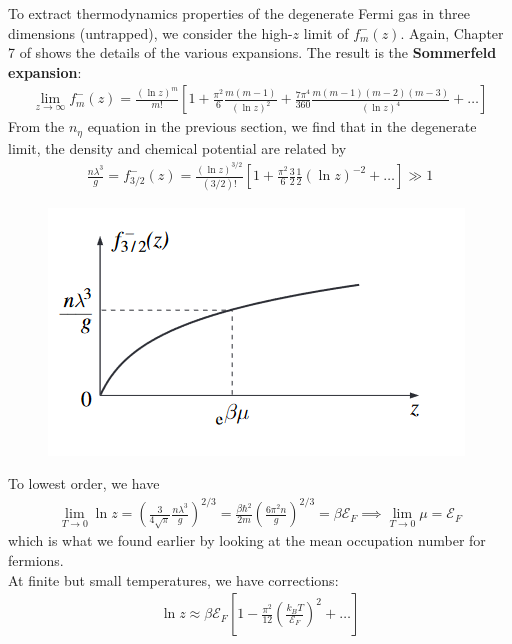\documentclass{book}
\theoremstyle{definition}
\newcommand{\be}{\beta}
\newcommand{\f}[2]{\frac{#1}{#2}}
\newcommand{\lp}{\left(}
\newcommand{\rp}{\right)}
\newcommand{\lb}{\left[}
\newcommand{\rb}{\right]}
\begin{document}
To extract thermodynamics properties of the degenerate Fermi gas in three dimensions (untrapped), we consider the high-$z$ limit of $f_m^-(z)$. Again, Chapter 7 of \cite{kardar2007statistical} shows the details of the various expansions. The result is the \textbf{Sommerfeld expansion}:
\begin{align*}
	\lim_{z\to \infty} f_m^-(z) = \f{(\ln z)^m}{m!} \lb 1 + \f{\pi^2}{6}  \f{m(m-1)}{(\ln z)^2} + \f{7\pi^4}{360} \f{m(m-1)(m-2)(m-3)}{(\ln z)^4} + \dots \rb
\end{align*} 
From the $n_\eta$ equation in the previous section, we find that in the degenerate limit, the density and chemical potential are related by 
\begin{align*}
	\f{n\lambda^3}{g} = f_{3/2}^{-}(z) = \f{(\ln z)^{3/2} }{(3/2)!}\lb 1 + \f{\pi^2}{6}\f{3}{2}\f{1}{2}(\ln z)^{-2}  + \dots \rb \gg 1
\end{align*}

\begin{figure}[!htb]
	\centering
	\includegraphics[scale=0.8]{figures/chem_pot.png}
\end{figure}

To lowest order, we have
\begin{align*}
	\lim_{T\to 0} \ln z = \lp \f{3}{4\sqrt{\pi}} \f{n\lambda^3}{g} \rp^{2/3} = \f{\be \hbar^2}{2m} \lp \f{6\pi^2 n}{g} \rp^{2/3} = \be \mathcal{E}_F \implies \lim_{T\to 0} \mu = \mathcal{E}_F
\end{align*}
which is what we found earlier by looking at the mean occupation number for fermions. \\



At finite but small temperatures, we have corrections:
\begin{align*}
	\ln z \approx \be \mathcal{E}_F \lb 1 - \f{\pi^2}{12} \lp \f{k_B T}{\mathcal{E}_F} \rp^2 + \dots \rb
\end{align*}
\end{document}
